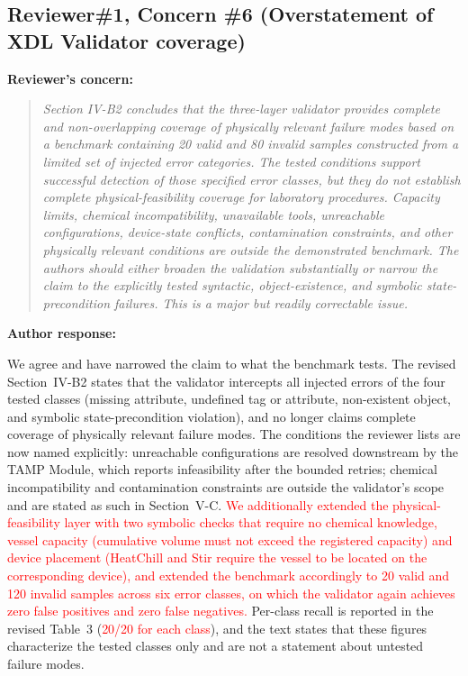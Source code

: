 \documentclass[11pt]{article}
\newcommand{\nd}[1]{\textcolor{red}{#1}}
\newif\ifshowstatus
\newcommand{\statusline}[2]{\ifshowstatus\par\noindent\textcolor{status#1}{\textbf{Status: \MakeUppercase{#1}.} #2}\par\smallskip\fi}
\newenvironment{concern}[3][pending]{\subsection*{\ifshowstatus\textcolor{status#1}{#2}\else#2\fi}\statusline{#1}{#3}\textbf{Reviewer's concern:}\begin{quote}\itshape}{\end{quote}}
\newenvironment{response}{\textbf{Author response:}\par\smallskip}{\par\medskip}
\begin{document}
\begin{concern}[pending]{Reviewer\#1, Concern \#6 (Overstatement of XDL Validator coverage)}{Claim narrowing can be applied now; B5 (validator extension) is optional---if skipped, delete the two red spans and this block is complete.}
Section IV-B2 concludes that the three-layer validator provides complete and non-overlapping coverage of physically relevant failure modes based on a benchmark containing 20 valid and 80 invalid samples constructed from a limited set of injected error categories.
The tested conditions support successful detection of those specified error classes, but they do not establish complete physical-feasibility coverage for laboratory procedures.
Capacity limits, chemical incompatibility, unavailable tools, unreachable configurations, device-state conflicts, contamination constraints, and other physically relevant conditions are outside the demonstrated benchmark.
The authors should either broaden the validation substantially or narrow the claim to the explicitly tested syntactic, object-existence, and symbolic state-precondition failures.
This is a major but readily correctable issue.
\end{concern}

\begin{response}
We agree and have narrowed the claim to what the benchmark tests.
The revised Section~IV-B2 states that the validator intercepts all injected errors of the four tested classes (missing attribute, undefined tag or attribute, non-existent object, and symbolic state-precondition violation), and no longer claims complete coverage of physically relevant failure modes.
The conditions the reviewer lists are now named explicitly: unreachable configurations are resolved downstream by the TAMP Module, which reports infeasibility after the bounded retries; chemical incompatibility and contamination constraints are outside the validator's scope and are stated as such in Section~V-C.
\nd{We additionally extended the physical-feasibility layer with two symbolic checks that require no chemical knowledge, vessel capacity (cumulative volume must not exceed the registered capacity) and device placement (HeatChill and Stir require the vessel to be located on the corresponding device), and extended the benchmark accordingly to 20 valid and 120 invalid samples across six error classes, on which the validator again achieves zero false positives and zero false negatives.}
Per-class recall is reported in the revised Table~3 (\nd{20/20 for each class}), and the text states that these figures characterize the tested classes only and are not a statement about untested failure modes.
\end{response}
\end{document}
